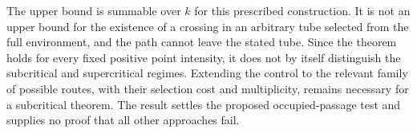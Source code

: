 \documentclass[11pt,letterpaper]{article}
\begin{document}
The upper bound is summable over $k$ for this prescribed construction. It is not an upper bound for the existence of a crossing in an arbitrary tube selected from the full environment, and the path cannot leave the stated tube. Since the theorem holds for every fixed positive point intensity, it does not by itself distinguish the subcritical and supercritical regimes. Extending the control to the relevant family of possible routes, with their selection cost and multiplicity, remains necessary for a subcritical theorem. The result settles the proposed occupied-passage test and supplies no proof that all other approaches fail.



\end{document}
